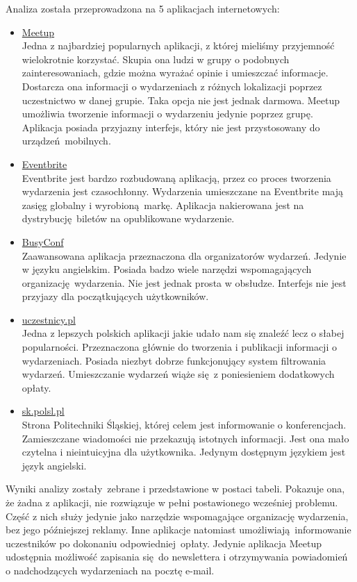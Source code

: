 Analiza została przeprowadzona na 5 aplikacjach internetowych:
\begin{itemize}
  \item \href{http://www.meetup.com/}{Meetup} \\
  Jedna z najbardziej popularnych aplikacji, z której mieliśmy przyjemność wielokrotnie korzystać. Skupia ona ludzi w grupy o podobnych zainteresowaniach, gdzie można wyrażać opinie i umieszczać informacje. Dostarcza ona informacji o wydarzeniach z różnych lokalizacji poprzez uczestnictwo w danej grupie. Taka opcja nie jest jednak darmowa. Meetup umożliwia tworzenie informacji o wydarzeniu jedynie poprzez grupę. Aplikacja posiada przyjazny interfejs, który nie jest przystosowany do urządzeń mobilnych.
  \item \href{https://www.eventbrite.com/}{Eventbrite} \\
  Eventbrite jest bardzo rozbudowaną aplikacją, przez co proces tworzenia wydarzenia jest czasochłonny. Wydarzenia umieszczane na Eventbrite mają zasięg globalny i wyrobioną markę. Aplikacja nakierowana jest na dystrybucję biletów na opublikowane wydarzenie.
  \item \href{http://busyconf.com/}{BusyConf} \\
  Zaawansowana aplikacja przeznaczona dla organizatorów wydarzeń. Jedynie w języku angielskim. Posiada badzo wiele narzędzi wspomagających organizację wydarzenia. Nie jest jednak prosta w obsłudze. Interfejs nie jest przyjazy dla początkujących użytkowników.
  \item \href{www.uczestnicy.pl/}{uczestnicy.pl} \\
  Jedna z lepszych polskich aplikacji jakie udało nam się znaleźć lecz o słabej popularności. Przeznaczona głównie do tworzenia i publikacji informacji o wydarzeniach. Posiada niezbyt dobrze funkcjonujący system filtrowania wydarzeń. Umieszczanie wydarzeń wiąże się z poniesieniem dodatkowych opłaty.
  \item \href{http://sk.polsl.pl/}{sk.polsl.pl} \\
  Strona Politechniki Śląskiej, której celem jest informowanie o konferencjach. Zamieszczane wiadomości nie przekazują istotnych informacji. Jest ona mało czytelna i nieintuicyjna dla użytkownika. Jedynym dostępnym językiem jest język angielski.
\end{itemize}


Wyniki analizy zostały zebrane i przedstawione w postaci tabeli. Pokazuje ona, że żadna z aplikacji, nie rozwiązuje w pełni postawionego wcześniej problemu. Część z nich służy jedynie jako narzędzie wspomagające organizację wydarzenia, bez jego późniejszej reklamy. Inne aplikacje natomiast umożliwiają informowanie uczestników po dokonaniu odpowiedniej opłaty. Jedynie aplikacja Meetup udostępnia możliwość zapisania się do newslettera i otrzymywania powiadomień o nadchodzących wydarzeniach na pocztę e-mail.

